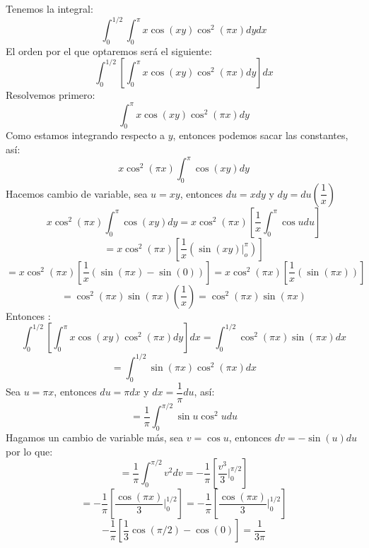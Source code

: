 \documentclass[a4paper,12pt]{article}
\begin{document}
Tenemos la integral:
 \[\int_{0}^{1/2}\int_{0}^\pi x\cos(xy) \cos^2 (\pi x) dy dx\]
El orden por el que optaremos será el siguiente: 
\[\int_{0}^{1/2} \left[ \int_{0}^{\pi} x\cos(xy) \cos^2(\pi x)dy \right] dx \]
Resolvemos primero:
\[\int_{0}^{\pi} x\cos(xy) \cos^2(\pi x)dy\]
Como estamos integrando respecto a $y$, entonces podemos sacar las constantes, así:
\[x\cos^2(\pi x)\int_{0}^{\pi} \cos(xy) dy\]
Hacemos cambio de variable, sea $u = xy$, entonces $du = x dy$ y $dy = du \left( \dfrac{1}{x} \right)$
\[x\cos^2(\pi x)\int_{0}^{\pi} \cos(xy) dy = x\cos^2(\pi x)\left[ \dfrac{1}{x} \int_{0}^{\pi}\cos u du \right] \]
\[= x\cos^2(\pi x)\left[\dfrac{1}{x}\left(\sin(xy)|_{o}^{\pi}\right) \right]\]
\[= x\cos^2(\pi x)\left[\dfrac{1}{x} \left(\sin(\pi x)- \sin(0) \right) \right]= x\cos^2(\pi x)\left[ \dfrac{1}{x} \left(\sin(\pi x)\right) \right]\]
\[= \cos^2(\pi x) \sin(\pi x) \left(\dfrac{1}{x} \right)= \cos^2(\pi x)\sin(\pi x)\]
Entonces : 
\[\int_{0}^{1/2} \left[ \int_{0}^{\pi} x\cos(xy) \cos^2(\pi x)dy \right] dx = \int_{0}^{1/2}\cos^2(\pi x)\sin(\pi x) dx\]
\[=\int_{0}^{1/2}\sin(\pi x)\cos^2(\pi x) dx\]
Sea $u= \pi x$, entonces $du= \pi dx$ y $dx= \dfrac{1}{\pi}du$, así: 
\[=\dfrac{1}{\pi} \int_{0}^{\pi/2}\sin u \cos^2u du\]
Hagamos un cambio de variable más, sea $v = \cos u$, entonces $dv = -\sin(u)du$ por lo que:
\[= \dfrac{1}{\pi} \int_{0}^{\pi / 2}v^2 dv = -\dfrac{1}{\pi}\left[\dfrac{v^3}{3}|_{0}^{\pi / 2}\right]\]
\[=-\dfrac{1}{\pi}\left[\dfrac{\cos(\pi x)}{3} |_{0}^{1/2}\right]= -\dfrac{1}{\pi}\left[\dfrac{\cos(\pi x)}{3}|_{0}^{1/2}\right]\]
\[-\dfrac{1}{\pi}\left[\dfrac{1}{3} \cos(\pi / 2)- \cos(0)\right]= \dfrac{1}{3\pi}\]
\end{document}
